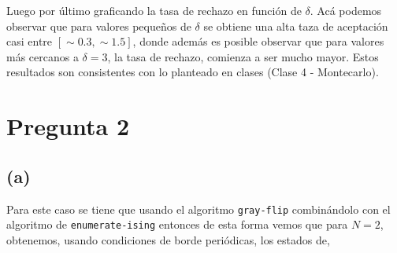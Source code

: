 \documentclass[11pt,a4paper]{article}
\begin{document}
Luego por último graficando la tasa de rechazo en función de $\delta$. Acá podemos observar que para valores pequeños de $\delta$ se obtiene una alta taza de aceptación casi entre $[\sim 0.3, \sim 1.5]$, donde además es posible observar que 
para valores más cercanos a $\delta = 3$, la tasa de rechazo, comienza a ser mucho mayor. Estos resultados son consistentes con lo planteado en clases (Clase 4 - Montecarlo).




\newpage
\section*{Pregunta 2}
\subsection*{(a)}   
Para este caso se tiene que usando el algoritmo \texttt{gray-flip} combinándolo con el algoritmo de \texttt{enumerate-ising} entonces de esta forma vemos que para $N = 2$, obtenemos,
usando condiciones de borde periódicas, los estados de,
\end{document}

